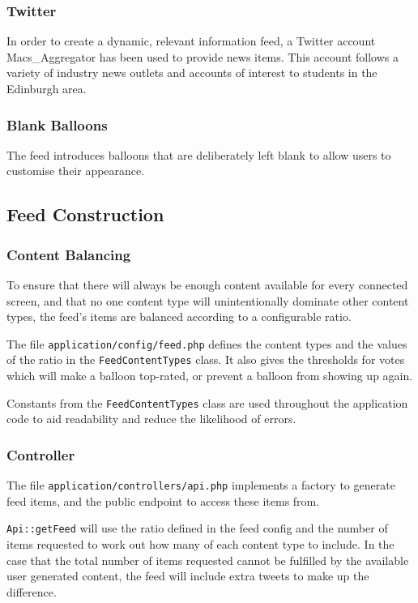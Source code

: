 \subsubsection{Twitter}
In order to create a dynamic, relevant information feed, a Twitter account Macs\_Aggregator has been used to provide news items. This account follows a variety of industry news outlets and accounts of interest to students in the Edinburgh area.

\subsubsection{Blank Balloons}
The feed introduces balloons that are deliberately left blank to allow users to customise their appearance.

\subsection{Feed Construction}

\subsubsection{Content Balancing}
To ensure that there will always be enough content available for every connected screen, and that no one content type will unintentionally dominate other content types, the feed's items are balanced according to a configurable ratio.

The file \texttt{application/config/feed.php} defines the content types and the values of the ratio in the \texttt{FeedContentTypes} class. It also gives the thresholds for votes which will make a balloon top-rated, or prevent a balloon from showing up again.

Constants from the \texttt{FeedContentTypes} class are used throughout the application code to aid readability and reduce the likelihood of errors.

\subsubsection{Controller}
The file \texttt{application/controllers/api.php} implements a factory to generate feed items, and the public endpoint to access these items from.

\texttt{Api::getFeed} will use the ratio defined in the feed config and the number of items requested to work out how many of each content type to include. In the case that the total number of items requested cannot be fulfilled by the available user generated content, the feed will include extra tweets to make up the difference.

